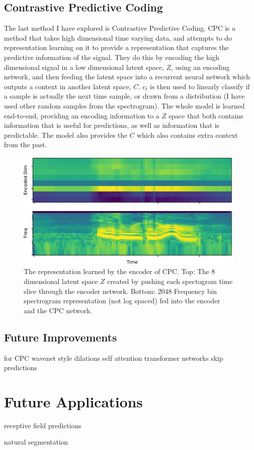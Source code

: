 \subsection{Contrastive Predictive Coding}
The last method I have explored is Contrastive Predictive Coding\cite{CPC}. CPC is a method that takes high dimensional time varying data, and attempts to do representation learning on it to provide a representation that captures the predictive information of the signal. They do this by encoding the high dimensional signal in a low dimensional latent space, $Z$, using an encoding network, and then feeding the latent space into a recurrent neural network which outputs a context in another latent space, $C$. $c_t$ is then used to linearly classify if a sample is actually the next time sample, or drawn from a distribution (I have used other random samples from the spectrogram). The whole model is learned end-to-end, providing an encoding information to a $Z$ space that both contains information that is useful for predictions, as well as information that is predictable. The model also provides the $C$ which also contains extra context from the past.

\begin{figure}[tbp] 
  \centering
  \includegraphics[width=\textwidth]{figures/encoder.pdf}
  \caption[8 dimensional $Z$ space learned by Contrastive Predictive Coding.]
{The representation learned by the encoder of CPC. Top: The 8 dimensional latent space $Z$ created by pushing each spectogram time slice through the encoder network. Bottom: 2048 Frequency bin spectrogram representation (not log spaced) fed into the encoder and the CPC network.
}
  \label{fig:encoder}
\end{figure}

\subsection{Future Improvements}
 for CPC
wavenet style dilations
self attention
transformer networks
skip predictions

\section{Future Applications}

receptive field predictions

natural segmentation
